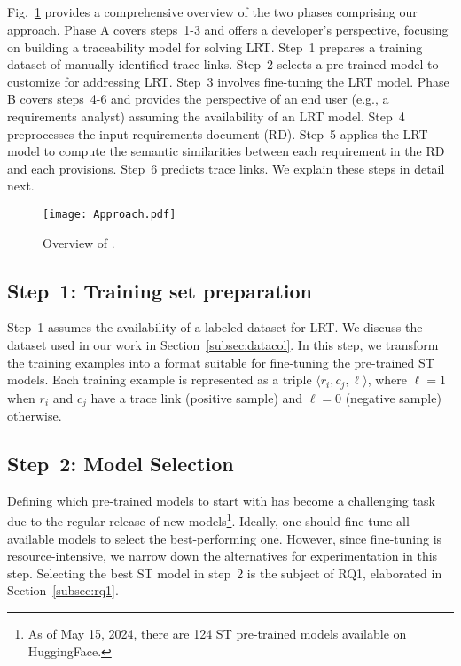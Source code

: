 \subsection{\kashif}
Fig.~\ref{fig:approach} provides a comprehensive overview of the two phases comprising our approach. 
Phase A covers steps~1-3 and offers a developer's perspective, focusing on building a traceability model for solving LRT. 
Step~1 prepares a training dataset of manually identified trace links. 
Step~2 selects a pre-trained model to customize for addressing LRT. Step~3 involves fine-tuning the LRT model.   
%
Phase B covers steps~4-6 and provides the perspective of an end user (e.g., a requirements analyst) assuming the availability of an LRT model.  
Step~4 preprocesses the input requirements document (RD). Step~5 applies the LRT model to compute the semantic similarities between each requirement in the RD and each provisions. Step~6 predicts trace links. 
We explain these steps in detail next.     

\begin{figure}[t]
\texttt{[image: Approach.pdf]}
  \caption{Overview of \kashif.}
  \label{fig:approach}
\end{figure}

\subsection*{Step~1: Training set preparation } 
Step~1 assumes the availability of a labeled dataset for LRT. We discuss the dataset used in our work in Section~\ref{subsec:datacol}. 
In this step, we transform the training examples into a format suitable for fine-tuning the pre-trained ST models. Each training example is represented as a triple $\langle r_i,c_j,\ell\rangle$, where $\ell=1$ when $r_i$ and $c_j$ have a trace link (positive sample) and $\ell=0$ (negative sample) otherwise. 

\subsection*{Step~2: Model Selection} 
Defining which pre-trained models to start with has become a challenging task due to the regular release of new models\footnote{As of May 15, 2024, there are 124 ST pre-trained models available on HuggingFace.}. 
Ideally, one should fine-tune all available models to select the best-performing one. However, since fine-tuning is resource-intensive, we narrow down the alternatives for experimentation in this step. 
%
Selecting the best ST model in step~2 is the subject of RQ1,  elaborated in Section~\ref{subsec:rq1}.  


